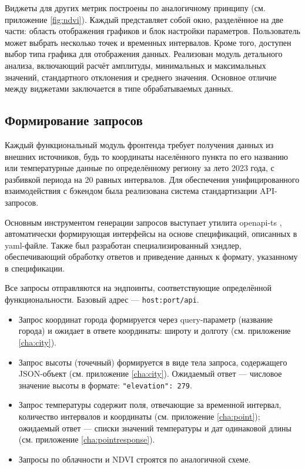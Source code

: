 Виджеты для других метрик построены по аналогичному принципу (см. приложение \ref{fig:ndvi}). Каждый представляет собой окно, разделённое на две части: область отображения графиков и блок настройки параметров. Пользователь может выбрать несколько точек и временных интервалов. Кроме того, доступен выбор типа графика для отображения данных. Реализован модуль детального анализа, включающий расчёт амплитуды, минимальных и максимальных значений, стандартного отклонения и среднего значения. Основное отличие между виджетами заключается в типе обрабатываемых данных.

\subsection*{Формирование запросов}

Каждый функциональный модуль фронтенда требует получения данных из внешних источников, будь то координаты населённого пункта по его названию или температурные данные по определённому региону за лето 2023 года, с разбивкой периода на 20 равных интервалов. Для обеспечения унифицированного взаимодействия с бэкендом была реализована система стандартизации API-запросов.

Основным инструментом генерации запросов выступает утилита openapi-ts \cite{OpenAPI_TS2023}, автоматически формирующая интерфейсы на основе спецификаций, описанных в yaml-файле. Также был разработан специализированный хэндлер, обеспечивающий обработку ответов и приведение данных к формату, указанному в спецификации.

Все запросы отправляются на эндпоинты, соответствующие определённой функциональности. Базовый адрес — \texttt{host:port/api}.

\begin{itemize}
	\item Запрос координат города формируется через query-параметр (название города) и ожидает в ответе координаты: широту и долготу (см. приложение \ref{cha:city}).
	
	\item Запрос высоты (точечный) формируется в виде тела запроса, содержащего JSON-объект (см. приложение \ref{cha:city}). Ожидаемый ответ — числовое значение высоты в формате: \texttt{"elevation": 279}.
	
	\item Запрос температуры содержит поля, отвечающие за временной интервал, количество интервалов и координаты (см. приложение \ref{cha:point}); ожидаемый ответ — списки значений температуры и дат одинаковой длины (см. приложение \ref{cha:pointresponse}). 
	
	\item Запросы по облачности и NDVI строятся по аналогичной схеме.
\end{itemize}

